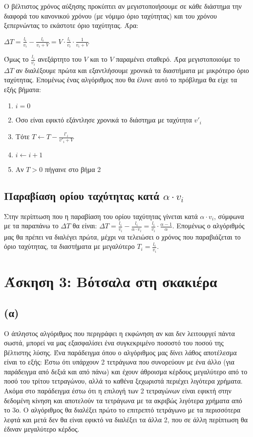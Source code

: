 \documentclass[a4paper,12pt]{report}
\begin{document}
Ο βέλτιστος χρόνος αύξησης προκύπτει αν μεγιστοποιήσουμε σε κάθε διάστημα την διαφορά του κανονικού χρόνου (με νόμιμο όριο ταχύτητας) και του χρόνου ξεπερνώντας το εκάστοτε όριο ταχύτητας. Άρα:
\begin{center}
$\Delta T = \frac{l_i}{v_i} - \frac{l_i}{v_i+V} = V \cdot \frac{l_i}{v_i} \cdot \frac{1}{v_i+V}$
\end{center}
Όμως το $\frac{l_i}{v_i}$ ανεξάρτητο του $V$ και το $V$ παραμένει σταθερό. Άρα μεγιστοποιούμε το $\Delta T$ αν διαλέξουμε πρώτα και εξαντλήσουμε χρονικά τα διαστήματα με μικρότερο όριο ταχύτητας. Επομένως ένας αλγόριθμος που θα έλυνε αυτό το πρόβλημα θα είχε τα εξής βήματα:
\begin{enumerate}
 \item $i=0$
 \item Όσο είναι εφικτό εξάντλησε χρονικά το διάστημα με ταχύτητα $v'_i$
 \item Τότε $T \gets T-\frac{l'_i}{v'_i+V}$
 \item $i \gets i+1$
 \item Αν $T>0$ πήγαινε στο βήμα 2
\end{enumerate}

\subsection*{Παραβίαση ορίου ταχύτητας κατά $\alpha \cdot v_i$}
Στην περίπτωση που η παραβίαση του ορίου ταχύτητας γίνεται κατά $\alpha \cdot v_i$, σύμφωνα με τα παραπάνω το $\Delta T$ θα είναι: $\Delta T = \frac{l_i}{v_i} - \frac{l_i}{\alpha \cdot v_i} = \frac{l_i}{v_i} \cdot \frac{\alpha-1}{\alpha}$. Επομένως ο αλγόριθμός μας θα πρέπει να διαλέγει πρώτα, μέχρι να τελειώσει ο χρόνος που παραβιάζεται το όριο ταχύτητας, τα διαστήματα με μεγαλύτερο $T_i=\frac{l_i}{v_i}$.     

\section*{Άσκηση 3: Βότσαλα στη σκακιέρα}
\subsection*{(α)}
Ο άπληστος αλγόριθμος που περιγράφει η εκφώνηση αν και δεν λειτουργεί πάντα σωστά, μπορεί να μας εξασφαλίσει ένα συγκεκριμένο ποσοστό του ποσού της βέλτιστης λύσης. Ένα παράδειγμα όπου ο αλγόριθμος μας δίνει λάθος αποτέλεσμα είναι το εξής: Έστω ότι υπάρχουν 2 τετράγωνα που συνορεύουν με ένα άλλο (για παράδειγμα από δεξιά και από πάνω) και έχουν άθροισμα κέρδους μεγαλύτερο από το ποσό του τρίτου τετραγώνου, αλλά το καθένα ξεχωριστά περιέχει λιγότερα χρήματα. Ακόμα στο παράδειγμα έστω ότι η επιλογή των 2 τετραγώνων είναι εφικτή στην δεδομένη κίνηση και αποτελούν τα τετράγωνα με τα ακριβώς λιγότερα χρήματα από το 3ο. Ο αλγόριθμος θα διαλέξει πρώτο το επιτρεπτό τετράγωνο με τα περισσότερα λεφτά και μετά δεν θα είναι εφικτό να διαλέξει τα άλλα 2, που σε άλλη περίπτωση θα έδιναν μεγαλύτερο κέρδος. 
\end{document}
